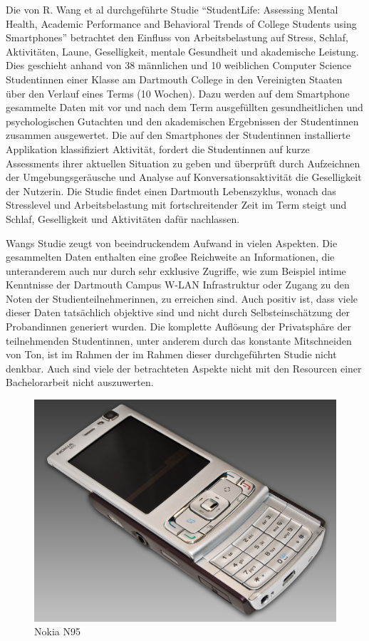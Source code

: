 Die von R. Wang et al durchgeführte Studie "`StudentLife: Assessing Mental Health, Academic Performance and Behavioral Trends of College Students using Smartphones"'
betrachtet den Einfluss von Arbeitsbelastung auf Stress, Schlaf, Aktivitäten, Laune, Geselligkeit, mentale Gesundheit und akademische Leistung.
Dies geschieht anhand von 38 männlichen und 10 weiblichen Computer Science Studentinnen einer Klasse am Dartmouth College in den Vereinigten Staaten über den Verlauf eines Terms (10 Wochen).
Dazu werden auf dem Smartphone gesammelte Daten mit vor und nach dem Term ausgefüllten gesundheitlichen und psychologischen Gutachten und den akademischen Ergebnissen der Studentinnen zusammen ausgewertet.
Die auf den Smartphones der Studentinnen installierte Applikation klassifiziert Aktivität, fordert die Studentinnen auf kurze Assessments ihrer aktuellen Situation zu geben und überprüft durch Aufzeichnen der Umgebungsgeräusche und Analyse auf Konversationsaktivität die Geselligkeit der Nutzerin.
Die Studie findet einen Dartmouth Lebenszyklus, wonach das Stresslevel und Arbeitsbelastung mit fortschreitender Zeit im Term steigt und Schlaf, Geselligkeit und Aktivitäten dafür nachlassen.
\par
Wangs Studie zeugt von beeindruckendem Aufwand in vielen Aspekten. 
Die gesammelten Daten enthalten eine großee Reichweite an Informationen, die unteranderem auch nur durch sehr exklusive Zugriffe, wie zum Beispiel intime Kenntnisse der Dartmouth Campus W-LAN Infrastruktur oder Zugang zu den Noten der Studienteilnehmerinnen, zu erreichen sind.
Auch positiv ist, dass viele dieser Daten tatsächlich objektive sind und nicht durch Selbsteinschätzung der Probandinnen generiert wurden.
Die komplette Auflösung der Privatsphäre der teilnehmenden Studentinnen, unter anderem durch das konstante Mitschneiden von Ton, ist im Rahmen der im Rahmen dieser durchgeführten Studie nicht denkbar. 
Auch sind viele der betrachteten Aspekte nicht mit den Resourcen einer Bachelorarbeit nicht auszuwerten.



\begin{figure}[h]
    \centering
    \includegraphics[width=\textwidth]{images/N95_Front-slide-open}
    \caption{Nokia N95\cite{nokiaPhone}}
    \label{nokia}
\end{figure}

